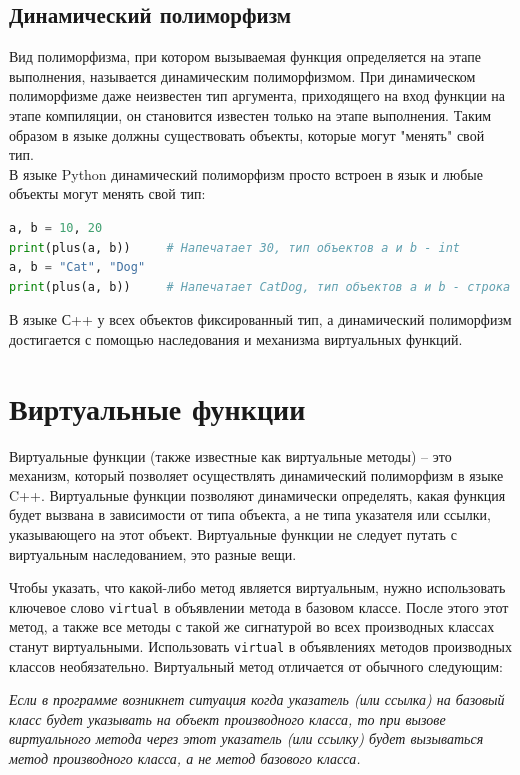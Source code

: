 \documentclass{article}
\begin{document}
\subsection*{Динамический полиморфизм}
Вид полиморфизма, при котором вызываемая функция определяется на этапе выполнения, называется динамическим полиморфизмом. При динамическом полиморфизме даже неизвестен тип аргумента, приходящего на вход функции на этапе компиляции, он становится известен только на этапе выполнения. Таким образом в языке должны существовать объекты, которые могут "менять"{} свой тип.\\
В языке Python динамический полиморфизм просто встроен в язык и любые объекты могут менять свой тип:
\begin{lstlisting}[language=Python]
a, b = 10, 20
print(plus(a, b))     # Напечатает 30, тип объектов a и b - int
a, b = "Cat", "Dog"
print(plus(a, b))     # Напечатает CatDog, тип объектов a и b - строка
\end{lstlisting}
В языке С++ у всех объектов фиксированный тип, а динамический полиморфизм достигается с помощью наследования и механизма виртуальных функций.

\newpage
\section{Виртуальные функции}
Виртуальные функции (также известные как виртуальные методы) -- это механизм, который позволяет осуществлять динамический полиморфизм в языке C++.
Виртуальные функции позволяют динамически определять, какая функция будет вызвана в зависимости от типа объекта, а не типа указателя или ссылки, указывающего на этот объект.
Виртуальные функции не следует путать с виртуальным наследованием, это разные вещи.

Чтобы указать, что какой-либо метод является виртуальным, нужно использовать ключевое слово \texttt{virtual} в объявлении метода в базовом классе. После этого этот метод, а также все методы с такой же сигнатурой во всех производных классах станут виртуальными. Использовать \texttt{virtual} в объявлениях методов производных классов необязательно. Виртуальный метод отличается от обычного следующим:

\begin{center}
\textit{Если в программе возникнет ситуация когда указатель (или ссылка) на базовый класс будет указывать на объект производного класса, то при вызове виртуального метода через этот указатель (или ссылку) будет вызываться метод производного класса, а не метод базового класса.}
\end{center}
\end{document}
